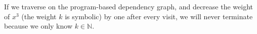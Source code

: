 %
If we traverse on the program-based dependency graph, and decrease the weight of $x^3$ (the weight $k$ is symbolic) by one after every visit,
we will never terminate because we only know $k \in \mathbb{N}$.


